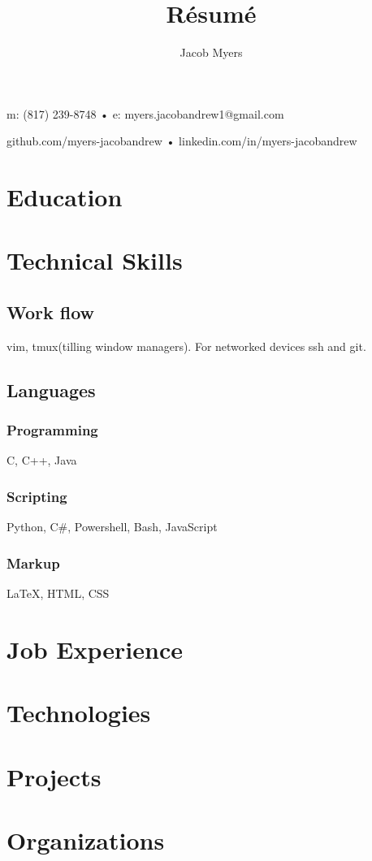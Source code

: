 \documentclass[8pt]{article}
\makeatletter
\renewcommand{\maketitle}{
\begin{center}
{\huge\bfseries
\theauthor}

m: (817) 239-8748 • e: myers.jacobandrew1@gmail.com

github.com/myers-jacobandrew • linkedin.com/in/myers-jacobandrew

\end{center}
}
\makeatother
\begin{document}
\title{R\'esum\'e}
\author{Jacob Myers}
\maketitle

\section{Education}
\section{Technical Skills}
\subsection{Work flow}
vim, tmux(tilling window managers). For networked devices ssh and git.
\subsection{Languages}
\subsubsection{Programming}
C, C++, Java
\subsubsection{Scripting}
Python, C\#, Powershell, Bash, JavaScript
\subsubsection{Markup}
{\LaTeX}, HTML, CSS
\section{Job Experience}


\section{Technologies}

\section{Projects}

\section{Organizations}
\end{document}
